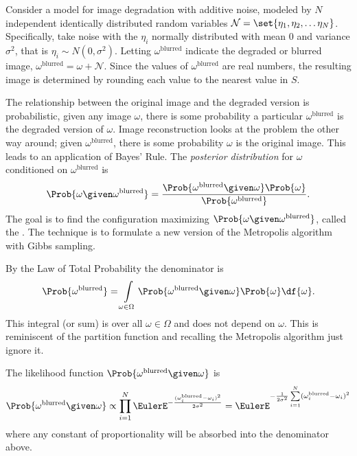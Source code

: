 \documentclass[12pt]{article}
\begin{document}
Consider a model for image degradation with additive noise, modeled by \(
N \) independent identically distributed random variables \(
\mathcal{N} = \set{\eta_1, \eta_2, \dots \eta_N} \).  Specifically, take
noise with the \( \eta_i \) normally distributed with mean \( 0 \) and
variance \( \sigma^2 \), that is \( \eta_i \sim N(0, \sigma^2) \).
Letting \( \omega^{\text{blurred}} \) indicate the degraded or blurred
image, \( \omega^{\text{blurred}} = \omega + \mathcal{N} \).  Since the
values of \( \omega^{\text{blurred}} \) are real numbers, the resulting
image is determined by rounding each value to the nearest value in \( S \).

The relationship between the original image and the degraded version is
probabilistic, given any image \( \omega \), there is some probability a
particular \( \omega^{\text{blurred}} \) is the degraded version of \(
\omega \).  Image reconstruction looks at the problem the other way
around; given \( \omega^{\text{blurred}} \), there is some probability \(
\omega \) is the original image.  This leads to an application of Bayes'
Rule.  The \emph{posterior distribution}%
for \( \omega \) conditioned on \( \omega^{\text{blurred}} \) is
\[
    \Prob{\omega \given \omega^{\text{blurred}}} = \frac{\Prob{\omega^{\text
    {blurred}} \given \omega} \Prob{\omega}} {\Prob{\omega^{\text{blurred}}}}.
\] The goal is to find the configuration maximizing \( \Prob{\omega
\given \omega^{\text{blurred}}} \), called the .%
The technique is to formulate a new version of the Metropolis algorithm
with Gibbs sampling.

By the Law of Total Probability the denominator is
\[
    \Prob{ \omega^{\text{blurred}}} = \int\limits_{\omega \in \Omega}
    \Prob{\omega^{\text{blurred}} \given \omega} \Prob{\omega} \df{\omega}.
\] This integral (or sum) is over all \( \omega \in \Omega \) and does
not depend on \( \omega \).  This is reminiscent of the partition
function and recalling the Metropolis algorithm just ignore it.

The likelihood function \( \Prob{\omega^{\text{blurred}} \given \omega} \)
is%
\[
    \Prob{\omega^{\text{blurred}} \given \omega} \propto \prod_{i=1}^N
    \EulerE^{-\frac{ (\omega_i^{\text{blurred}} - \omega_i)^2}{2 \sigma^2}}
    = \EulerE^{ -\frac{1}{2\sigma^2} \sum\limits_{i=1}^N (\omega_i^{\text
    {blurred}} - \omega_i)^2}
\] where any constant of proportionality will be absorbed into the
denominator above.
\end{document}
